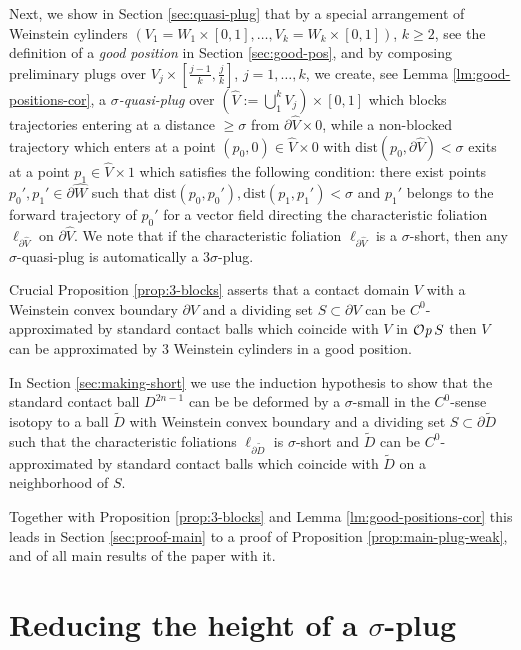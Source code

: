 \documentclass[12pt]{amsart}
\theoremstyle{plain}
\theoremstyle{definition}
\theoremstyle{remark}
\newcommand{\p}{\partial}
\newcommand{\wt}{\widetilde}
\newcommand{\wh}{\widehat}
\newcommand{\dist}{\mathrm{dist}}
\newcommand{\Op}{ {\mathcal O}{\it p}\,}
\begin{document}
Next, we show in Section \ref{sec:quasi-plug} that by a special arrangement  of Weinstein cylinders $(V_1=W_1\times[0,1],\dots, V_k=W_k\times[0,1])$, $k\geq 2$, see the definition of a {\em good position} in Section \ref{sec:good-pos}, and  by  composing   preliminary plugs over $V_j\times[\frac{j-1}k,\frac jk]$, $j=1,\dots, k$,   we   create, see Lemma \ref{lm:good-positions-cor}, a {\em $\sigma$-quasi-plug} over $(\wh V:=\bigcup\limits_1^k V_j)\times[0,1]$  which   blocks trajectories entering at a distance $\geq \sigma$ from $\p\wh V\times 0$, while a  non-blocked trajectory which enters at a point  $(p_0,0)\in\wh V\times 0$  with $\dist(p_0,\p\wh V)<\sigma$   exits at a  point $p_1\in \wh V\times 1  $  which satisfies the following condition: there exist  points  $p_0',p_1'\in\p\wh W$ such that $\dist(p_0,p_0'),\dist(p_1,p_1')<\sigma$ and $p_1'$ belongs to the forward trajectory of $p_0'$ for   a vector field directing the characteristic foliation $\ell_{\p\wh V}$ on $\p\wh V$. We note that if the characteristic foliation $\ell_{\p\wh V}$ is a $\sigma$-short, then any $\sigma$-quasi-plug  is automatically a $3\sigma$-plug.

Crucial Proposition \ref{prop:3-blocks} asserts   that  a contact domain $V$ with a Weinstein convex boundary  $\p V$ and a dividing  set $S\subset \p V$ can be $C^0$-approximated by standard contact balls which coincide with $V$ in $\Op S$ then $V$ can be approximated by  3 Weinstein cylinders in a good position.

In Section \ref{sec:making-short} we use  the induction hypothesis  to show  that the standard contact ball  $D^{2n-1}$ can be be deformed by a  $\sigma$-small in the $C^0$-sense isotopy to a ball $\wt D$  with Weinstein convex boundary and  a dividing set  $S\subset \p\wt D$  such that  the characteristic foliations $\ell_{\p \wt D}$  is $\sigma$-short  and   $\wt D$    can be  $C^0$-approximated by standard contact balls which coincide with $\wt D$ on a neighborhood of $S$.

Together with Proposition \ref{prop:3-blocks} and Lemma \ref{lm:good-positions-cor} this leads in Section \ref{sec:proof-main} to a  proof of Proposition \ref{prop:main-plug-weak}, and of all main results of the paper with it. 



  \section{Reducing the height of a $\sigma$-plug}\label{sec:plug-height}
\end{document}
